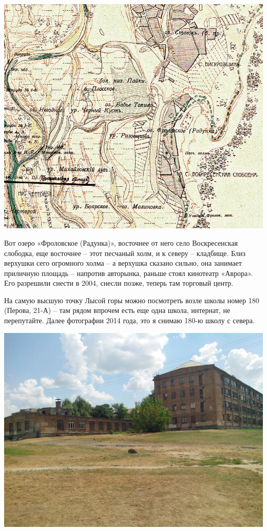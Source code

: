 \vspace*{\fill}
\begin{center}
\includegraphics[width=\textwidth]{chast-gorodki/lysaya/s_1914-map.jpg}
\end{center}
\vspace*{\fill}

Вот озеро «Фроловское (Радунка)», восточнее от него село Воскресенская слободка, еще восточнее – этот песчаный холм, и к северу – кладбище. Близ верхушки сего огромного холма – а верхушка сказано сильно, она занимает приличную площадь – напротив авторынка, раньше стоял кинотеатр «Аврора». Его разрешили снести в 2004, снесли позже, теперь там торговый центр.

На самую высшую точку Лысой горы можно посмотреть возле школы номер 180 (Перова, 21-А) – там рядом впрочем есть еще одна школа, интернат, не перепутайте. Далее фотографии 2014 года, это я снимаю 180-ю школу с севера.

\newpage
\vspace*{\fill}
\begin{center}
\includegraphics[width=\textwidth]{chast-gorodki/lysaya/s_IMG_20140806_124634.jpg}
\end{center}

